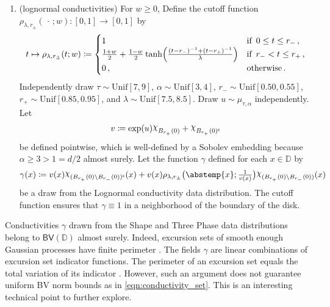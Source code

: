 \documentclass[pdflatex,sn-mathphys-num]{sn-jnl-preprint}
\newcommand{\D}{\mathbb{D}}
\newcommand{\BV}{\mathsf{BV}}
\newcommand{\abs}{\abstemp}
\DeclareRobustCommand{\rchi}{{\mathpalette\irchi\relax}}
\newcommand{\irchi}[2]{\raisebox{\depth}{$#1\chi$}} %
\newcommand{\defeq}{\coloneqq} %
\newcommand{\comp}{\textsf{c}} %
\newcommand{\Unif}{\mathrm{Unif}}
\newcommand{\al}{\alpha}
\newcommand{\slot}{{\,\cdot\,}}
\newcommand{\sfit}[1]{\textsf{\small{#1}}} %
\theoremstyle{thmstyleone}%
\theoremstyle{thmstyletwo}%
\theoremstyle{thmstylethree}%
\numberwithin{equation}{section}
\numberwithin{theorem}{section}
\begin{document}
\begin{appendices}
\begin{enumerate}[label=(\roman*),leftmargin=1.75\parindent,topsep=1.67ex,itemsep=0.5ex,partopsep=1ex,parsep=1ex]
    \item \sfit{(lognormal conductivities)} For $w\geq 0$, Define the cutoff function~\cite{miller2006applied} $\rho_{\lambda, r_{\pm}}(\slot;w)\colon [0,1]\to [0,1]$ by
    \begin{align}
        t\mapsto \rho_{\lambda, r_{\pm}}(t;w)\defeq
        \begin{cases}
           1  & \text{if }\, 0\leq t\leq r_{-} \,,\\
                      \frac{1+w}{2} + \frac{1-w}{2}\tanh\Bigl(\frac{(t-r_{-})^{-1} + (t-r_+)^{-1}}{\lambda}\Bigr)  & \text{if }\, r_{-}<t\leq r_+\,,\\
        0\, , & \text{otherwise}\,.
        \end{cases}
    \end{align}
    Independently draw $\tau\sim\Unif[7,9]$, $\al\sim\Unif[3,4]$, $r_-\sim\Unif[0.50,0.55]$, $r_+\sim\Unif[0.85,0.95]$, and $\lambda\sim \Unif[7.5,8.5]$. Draw $u\sim \mu_{\tau,\al}$ independently. Let 
    \begin{align}
        v\defeq \exp(u)\rchi_{B_{r_+}(0)} +\rchi_{B_{r_+}(0)^\comp} 
    \end{align}
    be defined pointwise, which is well-defined by a Sobolev embedding because $\al\geq 3>1=d/2$ almost surely. Let the function $\gamma$ defined for each $x\in\D$ by
    \begin{align}\label{eqn:app_gamma_lognormal}
        \gamma(x)\defeq v(x) \rchi_{(B_{r_+}(0)\setminus B_{r_-}(0))^\comp}(x) + v(x)\rho_{\lambda, r_{\pm}}\bigl(\abs{x};\tfrac{1}{v(x)}\bigr)\rchi_{(B_{r_+}(0)\setminus B_{r_-}(0))}(x)
    \end{align}
    be a draw from the Lognormal conductivity data distribution. The cutoff function ensures that $\gamma\equiv 1$ in a neighborhood of the boundary of the disk.
\end{enumerate}
Conductivities $\gamma$ drawn from the Shape and Three Phase data distributions belong to $\BV(\D)$ almost surely. Indeed, excursion sets of smooth enough Gaussian processes have finite perimeter \cite{adler2007random}. The fields $\gamma$ are linear combinations of excursion set indicator functions. The perimeter of an excursion set equals the total variation of its indicator \cite[Chp.~14]{leoni2017first}. However, such an argument does not guarantee uniform BV norm bounds as in \eqref{eqn:conductivity_set}. This is an interesting technical point to further explore.



\end{appendices}
\end{document}
